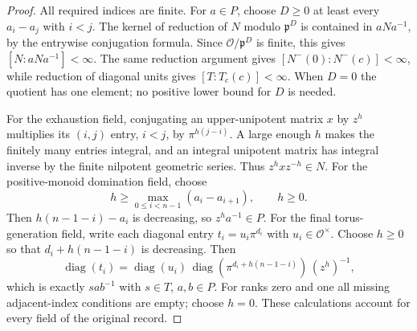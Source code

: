 \documentclass[11pt,a4paper]{article}
\numberwithin{equation}{section}
\theoremstyle{remark}\newtheorem{remark}[theorem]{Remark}
\begin{document}
\begin{proof}
All required indices are finite.  For $a\in P$, choose
$D\geq0$ at least every $a_i-a_j$ with $i<j$.
The kernel of reduction of $N$ modulo $\mathfrak p^D$
is contained in $aNa^{-1}$, by the entrywise conjugation
formula.  Since $\mathcal O/\mathfrak p^D$ is finite, this
gives $[N:aNa^{-1}]<\infty$.  The same reduction argument
gives $[N^-(0):N^-(c)]<\infty$, while reduction of diagonal
units gives $[T:T_c(c)]<\infty$.  When $D=0$ the quotient
has one element; no positive lower bound for $D$ is needed.

For the exhaustion field, conjugating an upper-unipotent
matrix $x$ by $z^h$ multiplies its $(i,\allowbreak{} j)$ entry, $i<j$,
by $\pi^{h(j-i)}$.  A large enough $h$ makes the finitely
many entries integral, and an integral unipotent matrix has
integral inverse by the finite nilpotent geometric series.
Thus $z^h xz^{-h}\in N$.  For the positive-monoid domination
field, choose
\[
          h\geq\max_{0\leq i<n-1}(a_i-a_{i+1}),\qquad h\geq0.
\]
Then $h(n-1-i)-a_i$ is decreasing, so $z^ha^{-1}\in P$.
For the final torus-generation field, write each diagonal
entry $t_i=u_i\pi^{d_i}$ with $u_i\in\mathcal O^\times$.
Choose $h\geq0$ so that $d_i+h(n-1-i)$ is decreasing.
Then
\[
 \operatorname{diag}(t_i)
 =\operatorname{diag}(u_i)\,
   \operatorname{diag}(\pi^{d_i+h(n-1-i)})\,(z^h)^{-1},
\]
which is exactly $s a b^{-1}$ with $s\in T$, $a,\allowbreak{} b\in P$.
For ranks zero and one all missing adjacent-index conditions
are empty; choose $h=0$.  These calculations account for every
field of the original record.
\end{proof}

\end{document}
